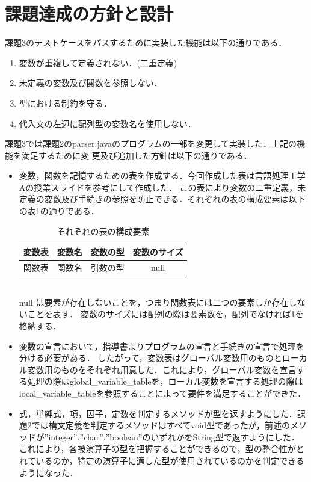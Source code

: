 \documentclass[dvipdfmx]{jarticle}
\begin{document}
\section{課題達成の方針と設計}
課題3のテストケースをパスするために実装した機能は以下の通りである．
\begin{enumerate}
  \item 変数が重複して定義されない．(二重定義)
  \item 未定義の変数及び関数を参照しない．
  \item 型における制約を守る．
  \item 代入文の左辺に配列型の変数名を使用しない．
\end{enumerate}
課題3では課題2のparser.javaのプログラムの一部を変更して実装した．上記の機能を満足するために変
更及び追加した方針は以下の通りである．
\begin{itemize}
  \item 変数，関数を記憶するための表を作成する．今回作成した表は言語処理工学Aの授業スライドを参考にして作成した．\cite{1}
  この表により変数の二重定義，未定義の変数及び手続きの参照を防止できる．それぞれの表の構成要素は以下の表1の通りである．
  \begin{table}[h]
    \centering
    \begin{tabular}{|c||c|c|c|}
      \hline
      変数表 & 変数名 & 変数の型 & 変数のサイズ\\\hline
      関数表 & 関数名 & 引数の型 & null\\\hline
    \end{tabular}
    \caption{それぞれの表の構成要素}
  \end{table}
  \\null は要素が存在しないことを，つまり関数表には二つの要素しか存在しないことを表す．
  変数のサイズには配列の際は要素数を，配列でなければ1を格納する．
  \item 変数の宣言において，指導書よりプログラムの宣言と手続きの宣言で処理を分ける必要がある．\cite{2}
  したがって，変数表はグローバル変数用のものとローカル変数用のものをそれぞれ用意した．これにより，グローバル変数を宣言する処理の際はglobal\_variable\_tableを，ローカル変数を宣言する処理の際はlocal\_variable\_tableを参照することによって要件を満足することができた．
  \item 式，単純式，項，因子，定数を判定するメソッドが型を返すようにした．課題2では構文定義を判定するメソッドはすべてvoid型であったが，前述のメソッドが”integer”,”char”,”boolean”のいずれかをString型で返すようにした．
  これにより，各被演算子の型を把握することができるので，型の整合性がとれているのか，特定の演算子に適した型が使用されているのかを判定できるようになった．
\end{itemize}
\end{document}
